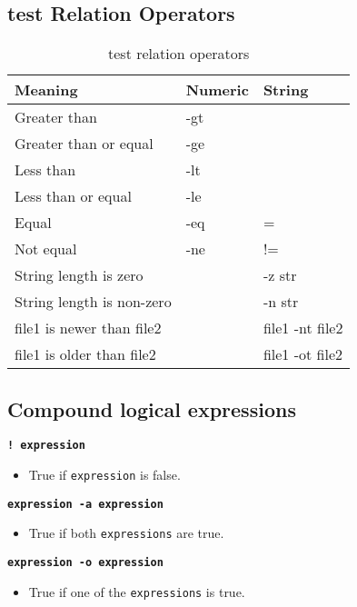 \documentclass{report}
\begin{document}
\subsection{test Relation Operators}
\begin{table}[h]
\centering
\begin{tabular}{@{}lll@{}}
\toprule
\textbf{Meaning}          & \textbf{Numeric} & \textbf{String}    \\ \midrule
Greater than              & -gt              &                    \\
Greater than or equal     & -ge              &                    \\
Less than                 & -lt              &                    \\
Less than or equal        & -le              &                    \\
Equal                     & -eq              & =                  \\
Not equal                 & -ne              & !=                 \\
String length is zero     &                  & -z str             \\
String length is non-zero &                  & -n str             \\
file1 is newer than file2 &                  & file1 -nt file2    \\
file1 is older than file2 &                  & file1 -ot file2    \\ \bottomrule
\end{tabular}
\caption{test relation operators}
\label{your-label-here}
\end{table}
\subsection{Compound logical expressions}
\bigbreak \noindent
\noindent\textbf{\texttt{! expression}}
\begin{itemize}[leftmargin=*,label={}]
  \item True if \texttt{expression} is false.
\end{itemize}

\noindent\textbf{\texttt{expression -a expression}}
\begin{itemize}[leftmargin=*,label={}]
  \item True if both \texttt{expressions} are true.
\end{itemize}

\noindent\textbf{\texttt{expression -o expression}}
\begin{itemize}[leftmargin=*,label={}]
  \item True if one of the \texttt{expressions} is true.
\end{itemize}
\end{document}
